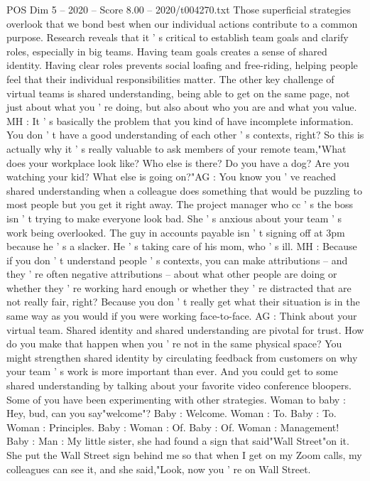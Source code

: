 \begin{textsample}{POS Dim 5 – 2020 – Score 8.00 – 2020/t004270.txt}
Those superficial strategies overlook that we bond best when our individual actions contribute to a common purpose.
Research reveals that it ' s critical to establish team goals and clarify roles, especially in big teams.
Having team goals creates a sense of shared identity.
Having clear roles prevents social loafing and free-riding, helping people feel that their individual responsibilities matter.
The other key challenge of virtual teams is shared understanding, being able to get on the same page, not just about what you ' re doing, but also about who you are and what you value.
MH : It ' s basically the problem that you kind of have incomplete information.
You don ' t have a good understanding of each other ' s contexts, right?
So this is actually why it ' s really valuable to ask members of your remote team,"What does your workplace look like?
Who else is there?
Do you have a dog?
Are you watching your kid?
What else is going on?"AG : You know you ' ve reached shared understanding when a colleague does something that would be puzzling to most people but you get it right away.
The project manager who cc ' s the boss isn ' t trying to make everyone look bad.
She ' s anxious about your team ' s work being overlooked.
The guy in accounts payable isn ' t signing off at 3pm because he ' s a slacker.
He ' s taking care of his mom, who ' s ill.
MH : Because if you don ' t understand people ' s contexts, you can make attributions -- and they ' re often negative attributions -- about what other people are doing or whether they ' re working hard enough or whether they ' re distracted that are not really fair, right?
Because you don ' t really get what their situation is in the same way as you would if you were working face-to-face.
AG : Think about your virtual team.
Shared identity and shared understanding are pivotal for trust.
How do you make that happen when you ' re not in the same physical space?
You might strengthen shared identity by circulating feedback from customers on why your team ' s work is more important than ever.
And you could get to some shared understanding by talking about your favorite video conference bloopers.
Some of you have been experimenting with other strategies.
Woman to baby : Hey, bud, can you say"welcome"?
Baby : Welcome.
Woman : To.
Baby : To.
Woman : Principles.
Baby : Woman : Of.
Baby : Of.
Woman : Management!
Baby : Man : My little sister, she had found a sign that said"Wall Street"on it.
She put the Wall Street sign behind me so that when I get on my Zoom calls, my colleagues can see it, and she said,"Look, now you ' re on Wall Street.

\end{textsample}
